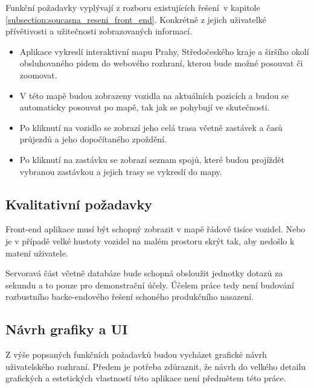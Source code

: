 Funkční požadavky vyplývají z rozboru existujících řešení v kapitole \ref{subsection:soucasna_reseni_front_end}. Konkrétně z jejich uživatelké přívětivosti a užitečnosti zobrazovaných informací.

\begin{itemize}

	\item Aplikace vykreslí interaktivní mapu Prahy, Středočeského kraje a širšího okolí obsluhovaného \gls{pid}em do webového rozhraní, kterou bude možné posouvat či zoomovat.

	\item V této mapě budou zobrazeny vozidla na aktuálních pozicích a budou se automaticky posouvat po mapě, tak jak se pohybují ve skutečnosti.

	\item Po kliknutí na vozidlo se zobrazí jeho celá trasa včetně zastávek a časů průjezdů a jeho dopočítaného zpoždění.

	\item Po kliknutí na zastávku se zobrazí seznam spojů, které budou projíždět vybranou zastávkou a jejich trasy se vykreslí do mapy.

\end{itemize}

\subsection{Kvalitativní požadavky}

Front-end aplikace musí být schopný zobrazit v mapě řádově tisíce vozidel. Nebo je v případě velké hustoty vozidel na malém prostoru skrýt tak, aby nedošlo k matení uživatele.

\bigbreak

Servoravá část včetně databáze bude schopná obsloužit jednotky dotazů za sekundu a to pouze pro demonstrační účely. Účelem práce tedy není budování rozbustního backe-endového řešení schoného produkčního nasazení.

\subsection{Návrh grafiky a UI}

Z výše popsaných funkčních požadavků budou vycházet grafické návrh uživatelského rozhraní. Předem je potřeba zdůraznit, že návrh do velkého detailu grafických a estetických vlastností této aplikace není předmětem této práce.

\bigbreak

